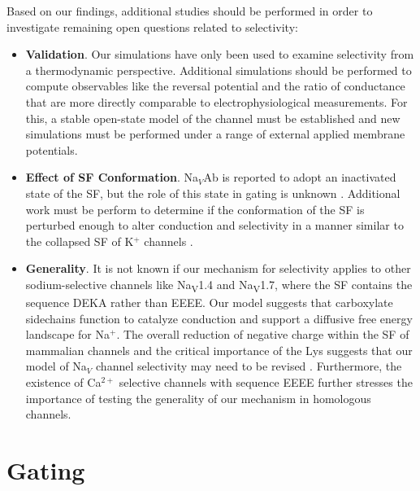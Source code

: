\begin{refsection}
Based on our findings, additional studies should be performed in order to investigate remaining open questions related to selectivity:
\begin{itemize}
\item \textbf{Validation}. Our simulations have only been used to examine selectivity from a thermodynamic perspective. Additional simulations should be performed to compute observables like the reversal potential and the ratio of conductance that are more directly comparable to electrophysiological measurements. For this, a stable open-state model of the channel must be established and new simulations must be performed under a range of external applied membrane potentials.
\item \textbf{Effect of SF Conformation}. Na$_V$Ab is reported to adopt an inactivated state of the SF, but the role of this state in gating is unknown \cite{Payandeh:2013ex}. Additional work must be perform to determine if the conformation of the SF is perturbed enough to alter conduction and selectivity in a manner similar to the collapsed SF of K$^+$ channels \cite{Zhou:2001vo}.
\item \textbf{Generality}. It is not known if our mechanism for selectivity applies to other sodium-selective channels like Na\textsubscript{V}1.4 and Na\textsubscript{V}1.7, where the SF contains the sequence DEKA rather than EEEE. Our model suggests that carboxylate sidechains function to catalyze conduction and support a diffusive free energy landscape for Na$^+$. The overall reduction of negative charge within the SF of mammalian channels and the critical importance of the Lys suggests that our model of Na$_V$ channel selectivity may need to be revised \cite{Ahern:2016jf,Heinemann:1992ep}. Furthermore, the existence of Ca$^{2+}$ selective channels with sequence EEEE further stresses the importance of testing the generality of our mechanism in homologous channels.
\end{itemize}

\section{Gating}


\end{refsection}
